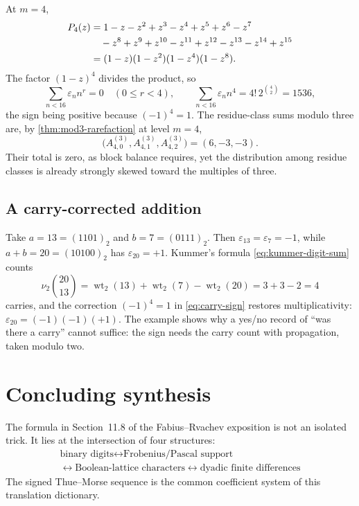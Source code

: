 \documentclass[11pt,oneside]{article}
\numberwithin{equation}{section}
\theoremstyle{definition}
\theoremstyle{remark}
\newcommand{\wt}{\operatorname{wt}_2}
\newcommand{\vtwo}{\nu_2}
\newcommand{\eps}{\varepsilon}
\begin{document}
At \(m=4\),
\begin{align}
  P_4(z)
  &=1-z-z^2+z^3-z^4+z^5+z^6-z^7
  \notag\\
  &\quad{}-z^8+z^9+z^{10}-z^{11}+z^{12}-z^{13}-z^{14}+z^{15}
  \notag\\
  &=(1-z)(1-z^2)(1-z^4)(1-z^8).
  \label{eq:P4-example}
\end{align}
The factor \((1-z)^4\) divides the product, so
\begin{equation}
  \sum_{n<16}\eps_nn^r=0
  \quad(0\le r<4),
  \qquad
  \sum_{n<16}\eps_nn^4=4!\,2^{\binom42}=1536,
  \label{eq:P4-moments}
\end{equation}
the sign being positive because \((-1)^4=1\).  The residue-class sums modulo
three are, by \cref{thm:mod3-rarefaction} at level \(m=4\),
\begin{equation}
  \bigl(A^{(3)}_{4,0},A^{(3)}_{4,1},A^{(3)}_{4,2}\bigr)=(6,-3,-3).
  \label{eq:P4-rarefied}
\end{equation}
Their total is zero, as block balance requires, yet the distribution among
residue classes is already strongly skewed toward the multiples of three.

\subsection{A carry-corrected addition}

Take \(a=13=(1101)_2\) and \(b=7=(0111)_2\).  Then
\(\eps_{13}=\eps_7=-1\), while \(a+b=20=(10100)_2\) has
\(\eps_{20}=+1\).  Kummer's formula \eqref{eq:kummer-digit-sum} counts
\begin{equation}
  \vtwo\binom{20}{13}=\wt(13)+\wt(7)-\wt(20)=3+3-2=4
  \label{eq:carry-example}
\end{equation}
carries, and the correction \((-1)^4=1\) in \eqref{eq:carry-sign} restores
multiplicativity: \(\eps_{20}=(-1)(-1)(+1)\).  The example shows why a
yes/no record of ``was there a carry'' cannot suffice: the sign needs the
carry count with propagation, taken modulo two.

\section[Conclusion]{Concluding synthesis}
\label{sec:conclusion}

The formula in Section~11.8 of the Fabius--Rvachev exposition is not an
isolated trick.  It lies at the intersection of four structures:
\begin{equation}
 \boxed{\begin{gathered}
 \text{binary digits}
 \longleftrightarrow
 \text{Frobenius/Pascal support}\\
 \longleftrightarrow
 \text{Boolean-lattice characters}
 \longleftrightarrow
 \text{dyadic finite differences}
 \end{gathered}}
 \label{eq:four-way-dictionary}
\end{equation}
The signed Thue--Morse sequence is the common coefficient system of this
translation dictionary.
\end{document}
